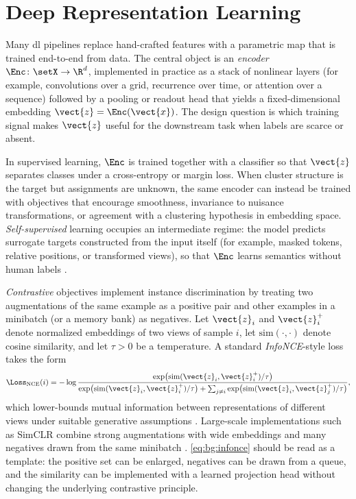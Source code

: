 \section{Deep Representation Learning}\label{sec:bg:dl}

Many \gls{dl} pipelines replace hand-crafted features with a parametric map that is trained end-to-end from data.
The central object is an \emph{encoder} \(\Enc \colon \setX \to \R^{d}\), implemented in practice as a stack of nonlinear layers (for example, convolutions over a grid, recurrence over time, or attention over a sequence) followed by a pooling or readout head that yields a fixed-dimensional embedding \(\vect{z} = \Enc(\vect{x})\).
The design question is which training signal makes \(\vect{z}\) useful for the downstream task when labels are scarce or absent.

In supervised learning, \(\Enc\) is trained together with a classifier so that \(\vect{z}\) separates classes under a cross-entropy or margin loss.
When cluster structure is the target but assignments are unknown, the same encoder can instead be trained with objectives that encourage smoothness, invariance to nuisance transformations, or agreement with a clustering hypothesis in embedding space.
\emph{Self-supervised} learning occupies an intermediate regime: the model predicts surrogate targets constructed from the input itself (for example, masked tokens, relative positions, or transformed views), so that \(\Enc\) learns semantics without human labels \parencite{chen2020simclr}.

\emph{Contrastive} objectives implement instance discrimination by treating two augmentations of the same example as a positive pair and other examples in a minibatch (or a memory bank) as negatives.
Let \(\vect{z}_i\) and \(\vect{z}_{i}^{+}\) denote normalized embeddings of two views of sample \(i\), let \(\mathrm{sim}(\cdot,\cdot)\) denote cosine similarity, and let \(\tau>0\) be a temperature.
A standard \emph{InfoNCE}-style loss takes the form
\begin{equation}
\label{eq:bg:infonce}
\Loss_{\mathrm{NCE}}(i)
=
-\log
\frac{\exp\bigl(\mathrm{sim}(\vect{z}_i,\vect{z}_{i}^{+})/\tau\bigr)}
{\exp\bigl(\mathrm{sim}(\vect{z}_i,\vect{z}_{i}^{+})/\tau\bigr)
 + \sum_{j \neq i} \exp\bigl(\mathrm{sim}(\vect{z}_i,\vect{z}_{j}^{+})/\tau\bigr)},
\end{equation}
which lower-bounds mutual information between representations of different views under suitable generative assumptions \parencite{oord2018representation}.
Large-scale implementations such as SimCLR combine strong augmentations with wide embeddings and many negatives drawn from the same minibatch \parencite{chen2020simclr}.
\cref{eq:bg:infonce} should be read as a template: the positive set can be enlarged, negatives can be drawn from a queue, and the similarity can be implemented with a learned projection head without changing the underlying contrastive principle.

